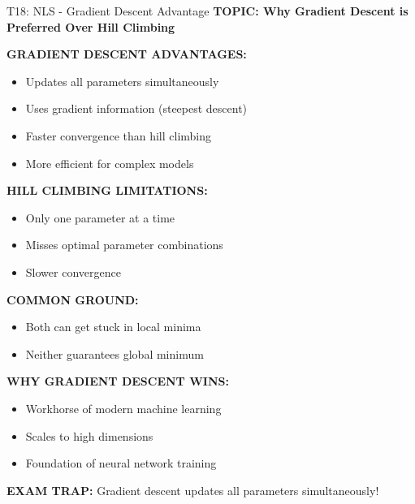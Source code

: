 \documentclass[8pt]{beamer}
\begin{document}
	\begin{frame}{T18: NLS - Gradient Descent Advantage}
		\fontsize{6.5}{7.5}\selectfont
		\textbf{TOPIC: Why Gradient Descent is Preferred Over Hill Climbing}
		
		\vspace{0.1cm}
		\textbf{GRADIENT DESCENT ADVANTAGES:}
		\begin{itemize}
			\item Updates all parameters simultaneously
			\item Uses gradient information (steepest descent)
			\item Faster convergence than hill climbing
			\item More efficient for complex models
		\end{itemize}
		
		\vspace{0.1cm}
		\textbf{HILL CLIMBING LIMITATIONS:}
		\begin{itemize}
			\item Only one parameter at a time
			\item Misses optimal parameter combinations
			\item Slower convergence
		\end{itemize}
		
		\vspace{0.1cm}
		\textbf{COMMON GROUND:}
		\begin{itemize}
			\item Both can get stuck in local minima
			\item Neither guarantees global minimum
		\end{itemize}
		
		\vspace{0.1cm}
		\textbf{WHY GRADIENT DESCENT WINS:}
		\begin{itemize}
			\item Workhorse of modern machine learning
			\item Scales to high dimensions
			\item Foundation of neural network training
		\end{itemize}
		
		\textcolor{myred}{\textbf{EXAM TRAP:}} Gradient descent updates \textcolor{myblue}{all parameters simultaneously}!
	\end{frame}
	
\end{document}
